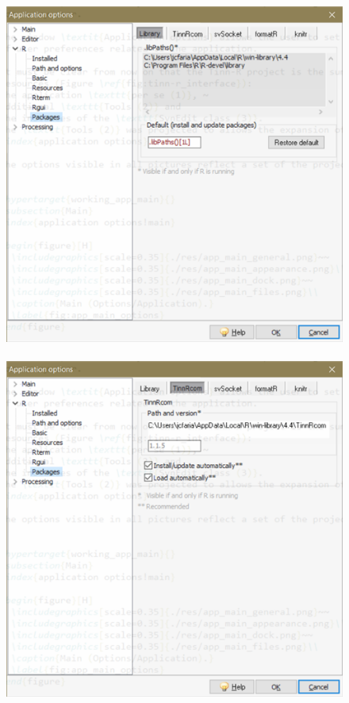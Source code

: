 \begin{figure}[h!]
  \includegraphics[scale=0.45]{./res/app_r_packages_library.png}~~
  \includegraphics[scale=0.45]{./res/app_r_packages_tinnrcom.png}~~

\end{figure}
